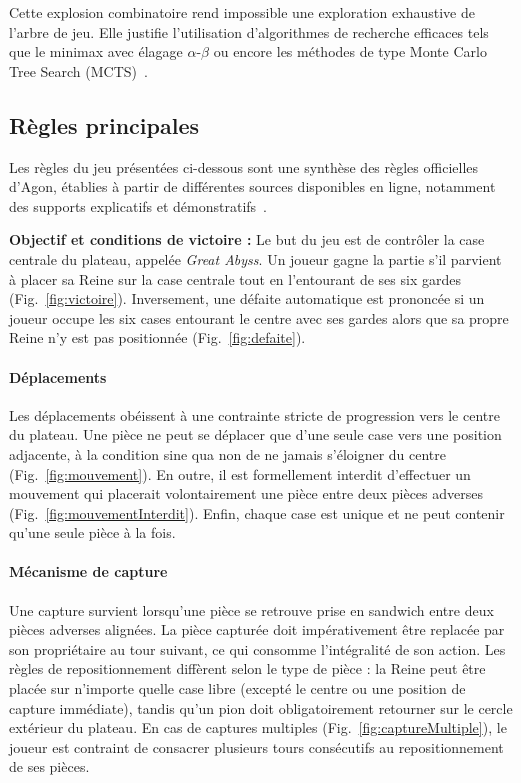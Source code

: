 \documentclass[a4paper]{article}
\begin{document}
Cette explosion combinatoire rend impossible une exploration exhaustive de l’arbre de jeu. Elle justifie l’utilisation d’algorithmes de recherche efficaces tels que le minimax avec élagage $\alpha$-$\beta$ ou encore les méthodes de type Monte Carlo Tree Search (MCTS)~\cite{browne2012survey}.
  
\subsection{Règles principales}

Les règles du jeu présentées ci-dessous sont une synthèse des règles officielles d’Agon, établies à partir de différentes sources disponibles en ligne, notamment des supports explicatifs et démonstratifs~\cite{agon_video}.

\textbf{Objectif et conditions de victoire :}  
Le but du jeu est de contrôler la case centrale du plateau, appelée \textit{Great Abyss}. Un joueur gagne la partie s'il parvient à placer sa Reine sur la case centrale tout en l'entourant de ses six gardes (Fig.~\ref{fig:victoire}). Inversement, une défaite automatique est prononcée si un joueur occupe les six cases entourant le centre avec ses gardes alors que sa propre Reine n'y est pas positionnée (Fig.~\ref{fig:defaite}).

\paragraph{Déplacements}
Les déplacements obéissent à une contrainte stricte de progression vers le centre du plateau. Une pièce ne peut se déplacer que d’une seule case vers une position adjacente, à la condition sine qua non de ne jamais s’éloigner du centre (Fig.~\ref{fig:mouvement}). En outre, il est formellement interdit d'effectuer un mouvement qui placerait volontairement une pièce entre deux pièces adverses (Fig.~\ref{fig:mouvementInterdit}). Enfin, chaque case est unique et ne peut contenir qu’une seule pièce à la fois.

\paragraph{\textbf{Mécanisme de capture}}
Une capture survient lorsqu’une pièce se retrouve prise en sandwich entre deux pièces adverses alignées. La pièce capturée doit impérativement être replacée par son propriétaire au tour suivant, ce qui consomme l'intégralité de son action. Les règles de repositionnement diffèrent selon le type de pièce : la Reine peut être placée sur n’importe quelle case libre (excepté le centre ou une position de capture immédiate), tandis qu'un pion doit obligatoirement retourner sur le cercle extérieur du plateau. En cas de captures multiples (Fig.~\ref{fig:captureMultiple}), le joueur est contraint de consacrer plusieurs tours consécutifs au repositionnement de ses pièces.
\end{document}
